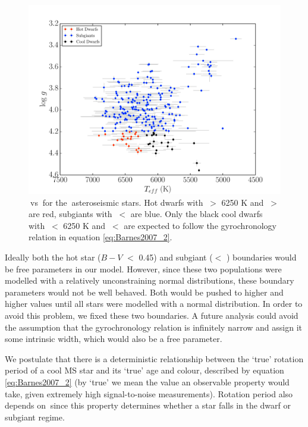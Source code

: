 \begin{figure}
\begin{center}
\includegraphics[width=6in, clip=true, trim=0 0 0.5in 0]{figures/logg_vs_t_paper.pdf}
\caption[\logg vs T$_{\mathrm{eff}}$ for \kepler\ stars]
{\logg$~$vs \teff$~$for the \nastero$~$asteroseismic stars. Hot dwarfs
with \teff$~>$ 6250 K and \logg$~>$ \subcut are red, subgiants with \logg$~<$
\subcut are blue. Only the black cool dwarfs with \teff$~<$ 6250 K and
\logg$~<$ \subcut are expected to follow the gyrochronology relation in
equation \ref{eq:Barnes2007_2}.
\label{fig:logg_vs_t}}
\end{center}
\end{figure}

Ideally both the hot star ($B-V$ $<$ 0.45) and subgiant (\logg $<$ \subcut)
boundaries would be free parameters in our model.
However, since these two populations were modelled with a relatively
unconstraining normal distributions, these boundary parameters would not be
well behaved.
Both would be pushed to higher and higher values until all stars were modelled
with a normal distribution.
In order to avoid this problem, we fixed these two boundaries.
A future analysis could avoid the assumption that the gyrochronology relation
is infinitely narrow and assign it some intrinsic width, which would also be
a free parameter.

We postulate that there is a deterministic relationship between the `true'
rotation period of a cool MS star and its `true' age and colour, described by
equation \ref{eq:Barnes2007_2} (by `true' we mean the value an observable
property would take, given extremely high signal-to-noise measurements).
Rotation period also depends on \logg$~$since this property determines whether
a star falls in the dwarf or subgiant regime.

